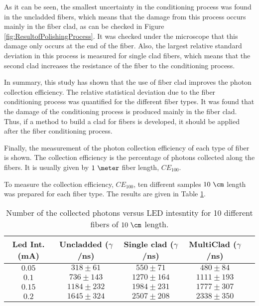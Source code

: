 As it can be seen, the smallest uncertainty in the conditioning process was found in the uncladded fibers, which means that the damage from this process occurs mainly in the fiber clad, as can be checked in Figure \ref{fig:ResultofPolishingProcess}. It was checked under the microscope that this damage only occurs at the end of the fiber. Also, the largest relative standard deviation in this process is measured for single clad fibers, which means that the second clad increases the resistance of the fiber to the conditioning process.

In summary, this study has shown that the use of fiber clad improves the photon collection efficiency. The relative statistical deviation due to the fiber conditioning process was quantified for the different fiber types. It was found that the damage of the conditioning process is produced mainly in the fiber clad. Thus, if a method to build a clad for fibers is developed, it should be applied after the fiber conditioning process.

Finally, the measurement of the photon collection efficiency of each type of fiber is shown. The collection efficiency is the percentage of photons collected along the fibers. It is usually given by $1~\meter$ fiber length, $CE_ {100}$.

To measure the collection efficiency, $CE_{100}$, ten different samples $10~\cm$ length was prepared for each fiber type. The results are given in Table \ref{tab:10DifferentSamplesAlltypes}.

\begin{table}[htbp]
\begin{center}
\begin{tabular}{|c|c|c|c|c|}
\hline
Led Int. (mA) & Uncladded ($\gamma$/ns) & Single clad ($\gamma$/ns) & MultiClad ($\gamma$/ns) \\
\hline \hline \hline
$0.05$ & $318 \pm 61$ & $550 \pm 71$ & $480 \pm 84$ \\ \hline
$0.1$ & $736 \pm 143$ & $1270 \pm 164$ & $1111 \pm 193$ \\ \hline
$0.15$ & $1184 \pm 232$ & $1984 \pm 231$ & $1777\pm 307$ \\ \hline
$0.2$ & $1645 \pm 324$ & $2507 \pm 208$ & $2338 \pm 350$ \\ \hline
\end{tabular}
\caption{Number of the collected photons versus LED intesntity for 10 different fibers of $10~\cm$ length.}
\label{tab:10DifferentSamplesAlltypes}
\end{center}
\end{table}

